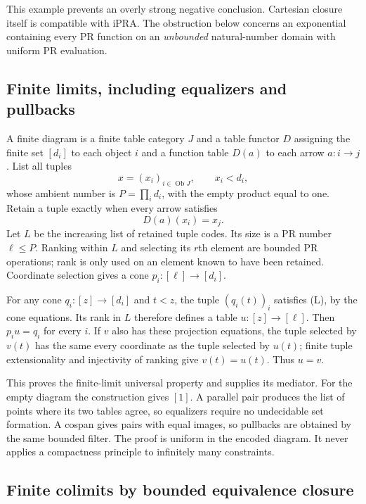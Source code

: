 This example prevents an overly strong negative conclusion.  Cartesian closure
itself is compatible with iPRA.  The obstruction below concerns an exponential
containing every PR function on an \emph{unbounded} natural-number domain with
uniform PR evaluation.

\subsection{Finite limits, including equalizers and pullbacks}

A finite diagram is a finite table category $J$ and a table functor $D$ assigning
the finite set $[d_i]$ to each object $i$ and a function table $D(a)$ to each arrow
$a:i\to j$.  List all tuples
\[
 x=(x_i)_{i\in\operatorname{Ob}J},\qquad x_i<d_i,
\]
whose ambient number is $P=\prod_i d_i$, with the empty product equal to one.
Retain a tuple exactly when every arrow satisfies
\[
 D(a)(x_i)=x_j.                                      \tag{L}
\]
Let $L$ be the increasing list of retained tuple codes.  Its size is a PR number
$\ell\le P$.  Ranking within $L$ and selecting its $r$th element are bounded PR
operations; rank is only used on an element known to have been retained.
Coordinate selection gives a cone $p_i:[\ell]\to[d_i]$.

For any cone $q_i:[z]\to[d_i]$ and $t<z$, the tuple $(q_i(t))_i$ satisfies (L),
by the cone equations.  Its rank in $L$ therefore defines a table
$u:[z]\to[\ell]$.  Then $p_i u=q_i$ for every $i$.  If $v$ also has these
projection equations, the tuple selected by $v(t)$ has the same every
coordinate as the tuple selected by $u(t)$; finite tuple extensionality and
injectivity of ranking give $v(t)=u(t)$.  Thus $u=v$.

This proves the finite-limit universal property and supplies its mediator.
For the empty diagram the construction gives $[1]$.  A parallel pair produces
the list of points where its two tables agree, so equalizers require no
undecidable set formation.  A cospan gives pairs with equal images, so pullbacks
are obtained by the same bounded filter.  The proof is uniform in the encoded
diagram.  It never applies a compactness principle to infinitely many
constraints.

\subsection{Finite colimits by bounded equivalence closure}

